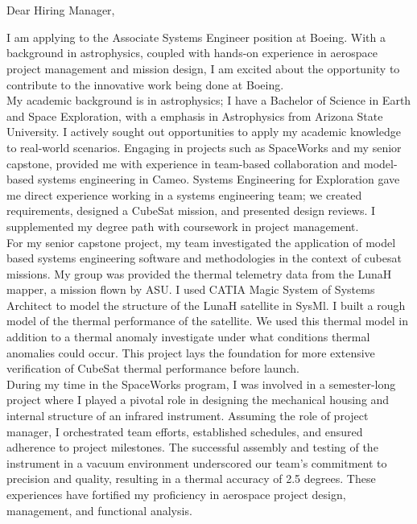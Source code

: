 \section{}




\bigskip

Dear Hiring Manager,


\bigskip
\hspace{1cm} I am applying to the Associate Systems Engineer position at Boeing. With a background in astrophysics, coupled with hands-on experience in aerospace project management and mission design, I am excited about the opportunity to contribute to the innovative work being done at Boeing.\\
\medskip{}
\hspace{1cm} My academic background is in astrophysics; I have a Bachelor of Science in Earth and Space Exploration, with a emphasis in Astrophysics from Arizona State University. I actively sought out opportunities to apply my academic knowledge to real-world scenarios. Engaging in projects such as SpaceWorks and my senior capstone, provided me with experience in team-based collaboration and model-based systems engineering in Cameo. Systems Engineering for Exploration gave me direct experience working in a systems engineering team; we created requirements, designed a CubeSat mission, and presented design reviews. I supplemented my degree path with coursework in project management.\\
\medskip{}
\hspace{1cm} For my senior capstone project, my team investigated the application of model based systems engineering software and methodologies in the context of cubesat missions. My group was provided the thermal telemetry data from the LunaH mapper, a mission flown by ASU. I used CATIA Magic System of Systems Architect to model the structure of the LunaH satellite in SysMl. I built a rough model of the thermal performance of the satellite. We used this thermal model in addition to a thermal anomaly investigate under what conditions thermal anomalies could occur. This project lays the foundation for more extensive verification of CubeSat thermal performance before launch.\\
\medskip{}
\hspace{1cm}
During my time in the SpaceWorks program, I was involved in a semester-long project where I played a pivotal role in designing the mechanical housing and internal structure of an infrared instrument. Assuming the role of project manager, I orchestrated team efforts, established schedules, and ensured adherence to project milestones. The successful assembly and testing of the instrument in a vacuum environment underscored our team's commitment to precision and quality, resulting in a thermal accuracy of 2.5 degrees. These experiences have fortified my proficiency in aerospace project design, management, and functional analysis.\\
